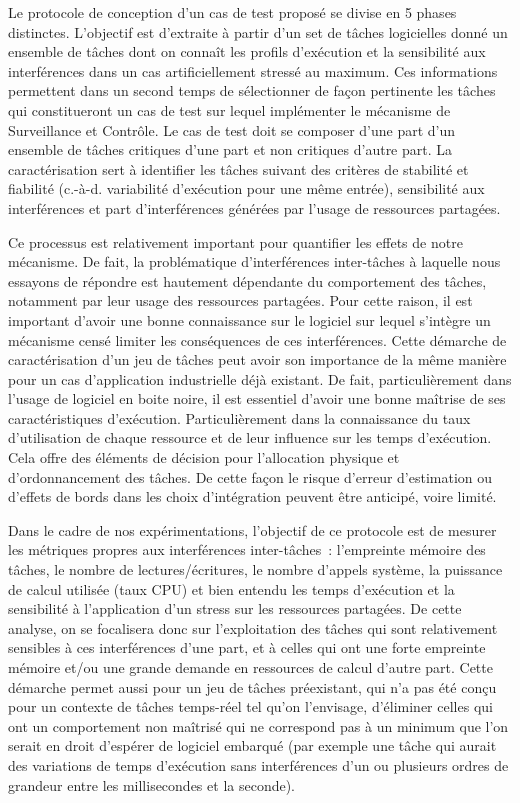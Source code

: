 \documentclass[french, a4paper, 11pt, twoside, pdftex]{StyleThese}
\begin{document}
        Le protocole de conception d'un cas de test proposé se divise en 5 phases distinctes. L'objectif est d'extraite à partir d'un set de tâches logicielles donné un ensemble de tâches dont on connaît les profils d'exécution et la sensibilité aux interférences dans un cas artificiellement stressé au maximum. Ces informations permettent dans un second temps de sélectionner de façon pertinente les tâches qui constitueront un cas de test sur lequel implémenter le mécanisme de Surveillance et Contrôle. Le cas de test doit se composer d'une part d'un ensemble de tâches critiques d'une part et non critiques d'autre part. La caractérisation sert à identifier les tâches suivant des critères de stabilité et fiabilité (c.-à-d. variabilité d'exécution pour une même entrée), sensibilité aux interférences et part d'interférences générées par l'usage de ressources partagées.
        
        Ce processus est relativement important pour quantifier les effets de notre mécanisme. De fait, la problématique d'interférences inter-tâches à laquelle nous essayons de répondre est hautement dépendante du comportement des tâches, notamment par leur usage des ressources partagées. Pour cette raison, il est important d'avoir une bonne connaissance sur le logiciel sur lequel s'intègre un mécanisme censé limiter les conséquences de ces interférences. Cette démarche de caractérisation d'un jeu de tâches peut avoir son importance de la même manière pour un cas d'application industrielle déjà existant. De fait, particulièrement dans l'usage de logiciel en boite noire, il est essentiel d'avoir une bonne maîtrise de ses caractéristiques d'exécution. Particulièrement dans la connaissance du taux d'utilisation de chaque ressource et de leur influence sur les temps d'exécution. Cela offre des éléments de décision pour l'allocation physique et d'ordonnancement des tâches. De cette façon le risque d'erreur d'estimation ou d'effets de bords dans les choix d'intégration peuvent être anticipé, voire limité.
        
        Dans le cadre de nos expérimentations, l'objectif de ce protocole est de mesurer les métriques propres aux interférences inter-tâches~: l'empreinte mémoire des tâches, le nombre de lectures/écritures, le nombre d'appels système, la puissance de calcul utilisée (taux CPU) et bien entendu les temps d'exécution et la sensibilité à l'application d'un stress sur les ressources partagées. De cette analyse, on se focalisera donc sur l'exploitation des tâches qui sont relativement sensibles à ces interférences d'une part, et à celles qui ont une forte empreinte mémoire et/ou une grande demande en ressources de calcul d'autre part. Cette démarche permet aussi pour un jeu de tâches préexistant, qui n'a pas été conçu pour un contexte de tâches temps-réel tel qu'on l'envisage, d'éliminer celles qui ont un comportement non maîtrisé qui ne correspond pas à un minimum que l'on serait en droit d'espérer de logiciel embarqué (par exemple une tâche qui aurait des variations de temps d'exécution sans interférences d'un ou plusieurs ordres de grandeur entre les millisecondes et la seconde).
        
\end{document}
